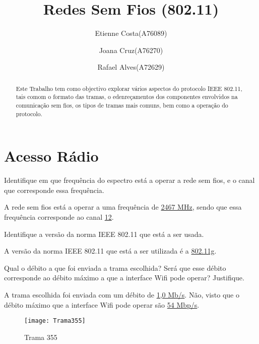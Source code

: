 \documentclass{exam}
\begin{document}
\title{Redes Sem Fios (802.11)}

\author{Etienne Costa(A76089) \and Joana Cruz(A76270) \and Rafael Alves(A72629)}

\date{}
\maketitle

\begin{abstract}
Este Trabalho tem como objectivo explorar vários aspectos do protocolo IEEE 802.11, tais comom o formato das tramas, o edenreçamentos dos componentes envolvidos na comunicação sem fios, os tipos de tramas mais comuns, bem como a operação do protocolo.
\end{abstract}
\section{Acesso Rádio}

\begin{questions}
\question Identifique em que frequência do espectro está a operar a rede sem fios, e o canal que corresponde essa frequência.
\begin{solution}
A rede sem fios está a operar a uma frequência de \underline{2467 MHz}, sendo que essa frequência corresponde ao canal \underline{12}.
\end{solution}

\question Identifique a versão da norma IEEE 802.11 que está a ser usada.
\begin{solution}
A versão da norma IEEE 802.11 que está a ser utilizada é a \underline{802.11g}. 
\end{solution}

\question Qual o débito a que foi enviada a trama escolhida? Será que esse débito corresponde ao débito máximo a que a interface Wifi pode operar? Justifique.
\begin{solution}
A trama escolhida foi enviada com um débito de \underline{1,0 Mb/s}. Não, visto que o débito máximo que a interface Wifi pode operar são \underline{54 Mbp/s}.
\end{solution}

\begin{figure}[H]
\centering\texttt{[image: Trama355]} 
\caption{\label{fig:controller}Trama 355}
\end{figure}

\end{questions}
\end{document}

